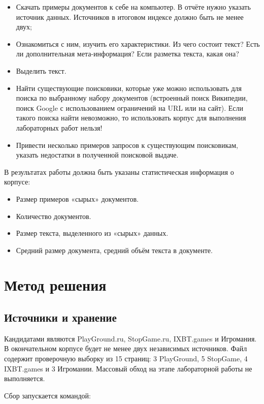 \documentclass[12pt,a4paper]{article}
\newcommand{\code}[1]{\texttt{\detokenize{#1}}}
\begin{document}
\begin{itemize}
  \item Скачать примеры документов к себе на компьютер. В отчёте нужно
  указать источник данных. Источников в итоговом индексе должно быть не
  менее двух;
  \item Ознакомиться с ним, изучить его характеристики. Из чего состоит
  текст? Есть ли дополнительная мета-информация? Если разметка текста, какая
  она?
  \item Выделить текст.
  \item Найти существующие поисковики, которые уже можно использовать для
  поиска по выбранному набору документов (встроенный поиск Википедии, поиск
  Google с использованием ограничений на URL или на сайт). Если такого поиска
  найти невозможно, то использовать корпус для выполнения лабораторных работ
  нельзя!
  \item Привести несколько примеров запросов к существующим поисковикам,
  указать недостатки в полученной поисковой выдаче.
\end{itemize}

В результатах работы должна быть указаны статистическая информация о корпусе:

\begin{itemize}
  \item Размер примеров «сырых» документов.
  \item Количество документов.
  \item Размер текста, выделенного из «сырых» данных.
  \item Средний размер документа, средний объём текста в документе.
\end{itemize}

\section{Метод решения}

\subsection{Источники и хранение}

Кандидатами являются PlayGround.ru, StopGame.ru, IXBT.games и Игромания.
В окончательном корпусе будет не менее двух независимых источников. Файл
\code{urls.txt} содержит проверочную выборку из 15 страниц: 3 PlayGround, 5
StopGame, 4 IXBT.games и 3 Игромании. Массовый обход на этапе лабораторной
работы не выполняется.

Сбор запускается командой:
\end{document}
